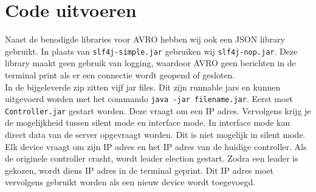 \documentclass[a4paper]{article}
\begin{document}
	\section{Code uitvoeren}
		Naast de benodigde libraries voor AVRO hebben wij ook een JSON library gebruikt. In plaats van \texttt{slf4j-simple.jar} gebruiken wij \texttt{slf4j-nop.jar}. Deze library maakt geen gebruik van logging, waardoor AVRO geen berichten in de terminal print als er een connectie wordt geopend of gesloten. \\\medskip
		In de bijgeleverde zip zitten vijf jar files. Dit zijn runnable jars en kunnen uitgevoerd worden met het commando \texttt{java -jar filename.jar}. Eerst moet \texttt{Controller.jar} gestart worden. Deze vraagt om een IP adres. Vervolgens krijg je de mogelijkheid tussen silent mode en interface mode. In interface mode kan direct data van de server opgevraagt worden. Dit is niet mogelijk in silent mode. \\
		Elk device vraagt om zijn IP adres en het IP adres van de huidige controller. Als de originele controller crasht, wordt leader election gestart. Zodra een leader is gekozen, wordt diens IP adres in de terminal geprint. Dit IP adres moet vervolgens gebruikt worden als een nieuw device wordt toegevoegd. 
	
\end{document}
